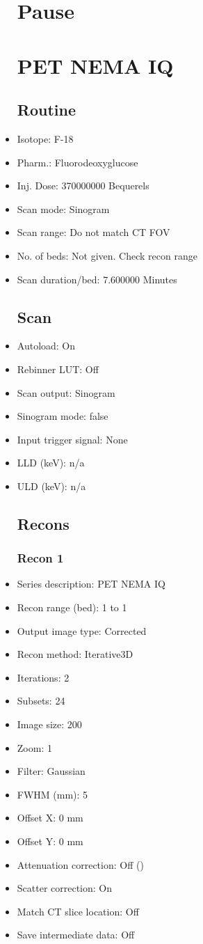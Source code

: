 \documentclass[12pt]{article}
\begin{document}
\begin{itemize}
\section{Pause}
\section{PET NEMA IQ}\subsection{Routine}
\item Isotope: F-18
\item Pharm.: Fluorodeoxyglucose
\item Inj. Dose: 370000000 Bequerels
\item Scan mode: Sinogram
\item Scan range: Do not match CT FOV
\item No. of beds: Not given. Check recon range
\item Scan duration/bed: 7.600000 Minutes
\subsection{Scan}
\item Autoload: On
\item Rebinner LUT: Off
\item Scan output: Sinogram
\item Sinogram mode: false
\item Input trigger signal: None
\item LLD (keV): n/a
\item ULD (keV): n/a
\subsection{Recons}
\subsubsection{Recon 1}
\item Series description: PET NEMA IQ
\item Recon range (bed): 1 to 1
\item Output image type: Corrected
\item Recon method: Iterative3D
\item Iterations: 2
\item Subsets: 24
\item Image size: 200
\item Zoom: 1
\item Filter: Gaussian
\item FWHM (mm): 5
\item Offset X: 0 mm
\item Offset Y: 0 mm
\item Attenuation correction: Off ()
\item Scatter correction: On
\item Match CT slice location: Off
\item Save intermediate data: Off
\end{itemize}
\end{document}
